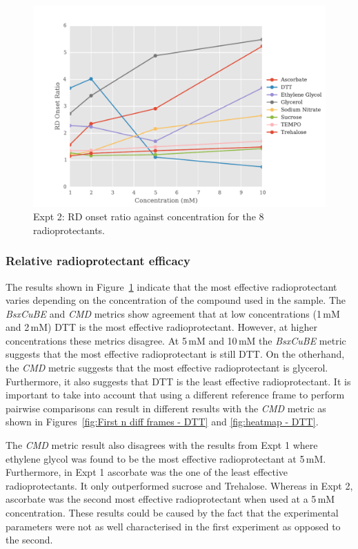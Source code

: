 \begin{figure}
    \centering
    \includegraphics[width=1.0\textwidth]{figures/saxs/RatioPlots.pdf}
    \caption[RD onset ratio against concentration for the 8 radioprotectants]{Expt 2: RD onset ratio against concentration for the 8 radioprotectants.}
    \label{fig:SAXS Ratio plot}
\end{figure}

\subsubsection{Relative radioprotectant efficacy}
\label{subs:Relative radioprotectant efficacy}
The results shown in Figure~\ref{fig:SAXS Ratio plot} indicate that the most effective radioprotectant varies depending on the concentration of the compound used in the sample.
The \textit{BsxCuBE} and \textit{CMD} metrics show agreement that at low concentrations (1$\,$mM and 2$\,$mM) DTT is the most effective radioprotectant.
However, at higher concentrations these metrics disagree.
At 5$\,$mM and 10$\,$mM the \textit{BsxCuBE} metric suggests that the most effective radioprotectant is still DTT.
On the otherhand, the \textit{CMD} metric suggests that the most effective radioprotectant is glycerol.
Furthermore, it also suggests that DTT is the least effective radioprotectant.
It is important to take into account that using a different reference frame to perform pairwise comparisons can result in different results with the \textit{CMD} metric as shown in Figures~\ref{fig:First n diff frames - DTT} and \ref{fig:heatmap - DTT}.

The \textit{CMD} metric result also disagrees with the results from Expt 1 where ethylene glycol was found to be the most effective radioprotectant at 5$\,$mM.
Furthermore, in Expt 1 ascorbate was the one of the least effective radioprotectants.
It only outperformed sucrose and Trehalose.
Whereas in Expt 2, ascorbate was the second most effective radioprotectant when used at a 5$\,$mM concentration.
These results could be caused by the fact that the experimental parameters were not as well characterised in the first experiment as opposed to the second.

